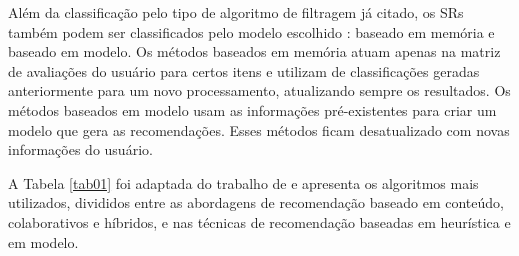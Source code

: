 Além da classificação pelo tipo de algoritmo de filtragem já citado, os SRs também podem 
ser classificados pelo modelo escolhido \cite{bobadilla2013}: baseado em memória e baseado em modelo. 
Os métodos baseados em memória atuam apenas na matriz de avaliações do usuário para certos itens e utilizam de 
classificações geradas anteriormente para um novo processamento, atualizando sempre os resultados. 
Os métodos baseados em modelo usam as informações pré-existentes para criar um
modelo que gera as recomendações. Esses métodos ficam desatualizado com novas informações do usuário.

A Tabela \ref{tab01} foi adaptada do trabalho de  e apresenta os algoritmos mais utilizados, 
divididos entre as abordagens de recomendação baseado em conteúdo, colaborativos e híbridos, e nas técnicas 
de recomendação baseadas em heurística e em modelo. 


